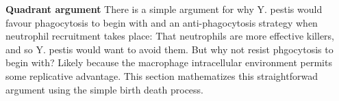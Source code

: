 \noindent
\textbf{Quadrant argument}
There is a simple argument for why Y.  pestis would favour phagocytosis to begin with and an anti-phagocytosis strategy  when neutrophil recruitment takes place: That neutrophils are more effective killers,  and so Y. pestis would want to avoid them.  But why not resist phgocytosis to begin with? Likely because the macrophage intracellular environment permits some replicative advantage. This section mathematizes this straightforwad argument using the simple birth death process. 
































































































